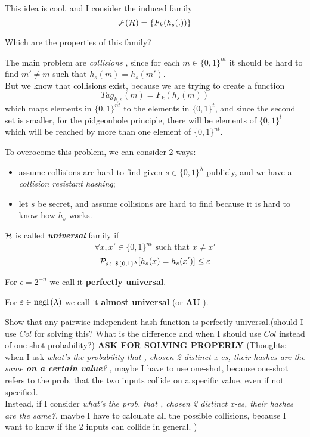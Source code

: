 This idea is cool, and I consider the induced family
\[
    \F(\H)=\{F_{k}(h_{s}(.))\}
\]
\begin{question}
Which are the properties of this family?
\end{question}

The main problem are \textit{collisions} , since for each $m \in \{0,1\}^{nt}$
it should be hard to find $m' \not= m$ such that $h_{s}(m)=h_{s}(m')$.\\
But we know that collisions exist, because we are trying to create a function 
\[
    Tag_{k, s}(m)=F_{k}(h_{s}(m))
\]
which maps elements in $\{0,1\}^{nt} $ to the elements in $\{0,1\}^{t}$, and
since the second set is smaller, for the pidgeonhole principle, there will be
 elements of $\{0,1\}^{t}$ which will be reached by more than one element of
$\{0,1\}^{nt}$.

To overocome this problem, we can consider 2 ways:
\begin{itemize}
    \item assume collisions are hard to find given $s \in \{0,1\}^{\lambda}$
        publicly, and we have a \textit{collision resistant hashing};
    \item let $s$ be secret, and assume collisions are hard to find because it
        is hard to know how $h_{s}$ works.
\end{itemize}
\begin{definition}
    $\H$ is called \textbf{ \textit{universal} } family if 
    \[
        \forall x, x' \in \{0,1\}^{nt} \text{ such that } x \not= x'
    \]
    \[
        \P_{s \leftarrow\$ \{0,1\}^{\lambda}} [ h_{s}(x)=h_{s}(x') ] \leq \epsilon  
    \]
\end{definition}

For $\epsilon=2^{-n}$ we call it \textbf{perfectly universal}.

For $\epsilon \in \negl{\lambda} $ we call it \textbf{almost universal} (or \textbf{AU} ).

\begin{exercise}
    Show that any pairwise independent hash function is perfectly
    universal.(should I use $Col$ for solving this? What is the difference and
    when I should use $Col$ instead of one-shot-probability?) \textbf{ASK FOR
    SOLVING PROPERLY} (Thoughts: when I ask \textit{what's the probability that
, chosen 2 distinct x-es, their hashes are the same \textbf{on a certain value}?
}, maybe I have to use one-shot, because one-shot refers to the prob. that the
two inputs collide on a specific value, even if not specified.\\
Instead, if I consider \textit{what's the prob. that , chosen 2 distinct x-es,
their hashes are the same?}, maybe I have to calculate all the possible
collisions, because I want to know if the 2 inputs can collide in general. )
\end{exercise}

